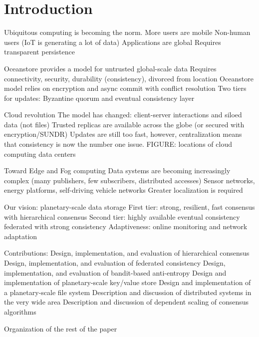 
\renewcommand{\thechapter}{1}

\chapter{Introduction}

Ubiquitous computing is becoming the norm.
    More users are mobile
    Non-human users (IoT is generating a lot of data)
    Applications are global
    Requires transparent persistence

Oceanstore provides a model for untrusted global-scale data
    Requires connectivity, security, durability (consistency), divorced from location
    Oceanstore model relies on encryption and async commit with conflict resolution
    Two tiers for updates: Byzantine quorum and eventual consistency layer

Cloud revolution
    The model has changed: client-server interactions and siloed data (not files)
    Trusted replicas are available across the globe (or secured with encryption/SUNDR)
    Updates are still too fast, however, centralization means that consistency is now the number one issue.
    FIGURE: locations of cloud computing data centers

Toward Edge and Fog computing
    Data systems are becoming increasingly complex (many publishers, few subscribers, distributed accesses)
    Sensor networks, energy platforms, self-driving vehicle networks
    Greater localization is required

Our vision: planetary-scale data storage
    First tier: strong, resilient, fast consensus with hierarchical consensus
    Second tier: highly available eventual consistency federated with strong consistency
    Adaptiveness: online monitoring and network adaptation

Contributions:
    Design, implementation, and evaluation of hierarchical consensus
    Design, implementation, and evaluation of federated consistency
    Design, implementation, and evaluation of bandit-based anti-entropy
    Design and implementation of planetary-scale key/value store
    Design and implementation of a planetary-scale file system
    Description and discussion of distributed systems in the very wide area
    Description and discussion of dependent scaling of consensus algorithms

Organization of the rest of the paper
